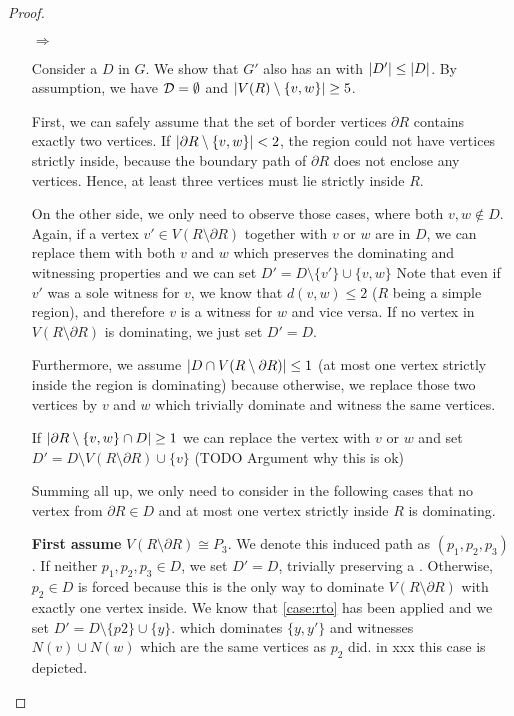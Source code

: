 \begin{proof}
    \begin{enumerate}
        \item[$\Rightarrow$] 
        
        Consider a \sdom $D$ in $G$. We show that $G'$ also has an \sdom with $\abs{D'} \leq \abs{D}$. By assumption, we have $\mathcal{D} = \emptyset$ and $\abs{V(R) \setminus \{v, w\}} \geq 5$. 

        First, we can safely assume that the set of border vertices  $\partial R$ contains exactly two vertices.
        If $\abs{\partial R \setminus \{v,w\}}  < 2$, the region could not have vertices strictly inside, because the boundary path of $\partial R$ does not enclose any vertices.
        Hence, at least three vertices must lie strictly inside $R$.

        On the other side, we only need to observe those cases, where both $v,w \notin D$. Again, if a vertex $v' \in V(R \setminus \partial R)$ together with $v$ or $w$ are in $D$, we can replace them with both $v$ and $w$ which preserves the dominating and witnessing properties and we can set $D' = D \setminus \{v'\} \cup \{v,w\}$ Note that even if $v'$ was a sole witness for $v$, we know that $d(v,w) \leq 2$ ($R$ being a simple region), and therefore $v$ is a witness for $w$ and vice versa. If no vertex in $V(R \setminus \partial R)$ is dominating, we just set $D' = D$. 

        Furthermore, we assume $\abs{D \cap V(R \setminus \partial R)} \leq 1$ (at most one vertex strictly inside the region is dominating) because otherwise, we replace those two vertices by $v$ and $w$ which trivially dominate and witness the same vertices.

        If $\abs{\partial R \setminus \{v,w\} \cap D} \geq 1$ we can replace the vertex with $v$ or $w$ and set $D' = D \setminus V(R \setminus \partial R) \cup \{v\}$ (TODO Argument why this is ok)

        Summing all up, we only need to consider in the following cases that no vertex from $\partial R \in D$ and at most one vertex strictly inside $R$ is dominating.

         \textbf{First assume} $V(R \setminus \partial R) \cong P_3$. We denote this induced path as $(p_1,p_2,p_3)$.         
         If neither $p_1,p_2,p_3 \in D$, we set $D' = D$, trivially preserving a \sdom. Otherwise, $p_2 \in D$ is forced because this is the only way to dominate $V(R \setminus \partial R)$ with exactly one vertex inside. We know that \cref{case:rto} has been applied and we set $D' = D \setminus \{p2\} \cup \{y\}$. which dominates $\{y,y'\}$ and witnesses $N(v) \cup N(w)$ which are the same vertices as $p_2$ did. in xxx this case is depicted.


\end{enumerate}
\end{proof}

